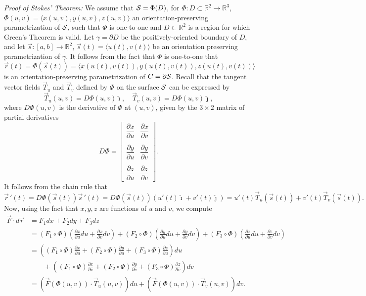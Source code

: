 \noindent\emph{Proof of Stokes' Theorem:}
 We assume that $\mathcal{S}=\Phi(D)$, for $\Phi:D\subset \mathbb{R}^2\to \mathbb{R}^3$, $\Phi(u,v) = \langle x(u,v),y(u,v),z(u,v)\rangle$ an orientation-preserving parametrization of $\mathcal{S}$, such that $\Phi$ is one-to-one and $D\subset \mathbb{R}^2$ is a region for which Green's Theorem is valid. Let $\gamma =\partial D$ be the positively-oriented boundary of $D$, and let $\vec{s}:[a,b]\to \mathbb{R}^2$, $\vec{s}(t)=\langle u(t),v(t)\rangle$ be an orientation preserving parametrization of $\gamma$. It follows from the fact that $\Phi$ is one-to-one that 
\[ 
\vec{r}(t) = \Phi(\vec{s}(t)) = \langle x(u(t),v(t)),y(u(t),v(t)),z(u(t),v(t))\rangle 
\]
is an orientation-preserving parametrization of $C=\partial \mathcal{S}$. Recall that the tangent vector fields $\vec{T}_u$ and $\vec{T}_v$ defined by $\Phi$ on the surface $\mathcal{S}$ can be expressed by
\[
 \vec{T}_u(u,v) = D\Phi(u,v)\hat{\imath},\quad \vec{T}_v(u,v) = D\Phi(u,v)\hat{\jmath},
\]
where $D\Phi(u,v)$ is the derivative of $\Phi$ at $(u,v)$, given by the $3\times 2$ matrix of partial derivatives
\[
 D\Phi = \begin{bmatrix} \dfrac{\partial x}{\partial u} & \dfrac{\partial x}{\partial v}\\ & \\ \dfrac{\partial y}{\partial u} & \dfrac{\partial y}{\partial v}\\ & \\ \dfrac{\partial z}{\partial u} & \dfrac{\partial z}{\partial v}\end{bmatrix}.
\]
It follows from the chain rule that 
\[
 \vec{r}\,'(t) = D\Phi(\vec{s}(t))\vec{s}\,'(t) = D\Phi(\vec{s}(t))(u'(t)\hat{\imath}+v'(t)\hat{\jmath}) = u'(t)\vec{T}_u(\vec{s}(t))+v'(t)\vec{T}_v(\vec{s}(t)).
\]
Now, using the fact that $x,y,z$ are functions of $u$ and $v$, we compute
\begin{align*}
 \vec{F}\cdot d\vec{r} &= F_1dx+F_2dy+F_3dz\\
& = (F_1\circ \Phi)\left(\frac{\partial x}{\partial u}du +\frac{\partial x}{\partial v}dv\right)+(F_2\circ \Phi)\left(\frac{\partial y}{\partial u}du +\frac{\partial y}{\partial v}dv\right)+(F_3\circ \Phi)\left(\frac{\partial z}{\partial u}du +\frac{\partial z}{\partial v}dv\right)\\
& = \left((F_1\circ\Phi)\frac{\partial x}{\partial u}+(F_2\circ\Phi)\frac{\partial y}{\partial u}+(F_3\circ\Phi)\frac{\partial z}{\partial u}\right)du\\
&\quad \quad+\left((F_1\circ\Phi)\frac{\partial x}{\partial v}+(F_2\circ\Phi)\frac{\partial y}{\partial v}+(F_3\circ\Phi)\frac{\partial z}{\partial v}\right)dv\\
& = \left(\vec{F}(\Phi(u,v))\cdot \vec{T}_u(u,v)\right)du + \left(\vec{F}(\Phi(u,v))\cdot \vec{T}_v(u,v)\right)dv.
\end{align*}
